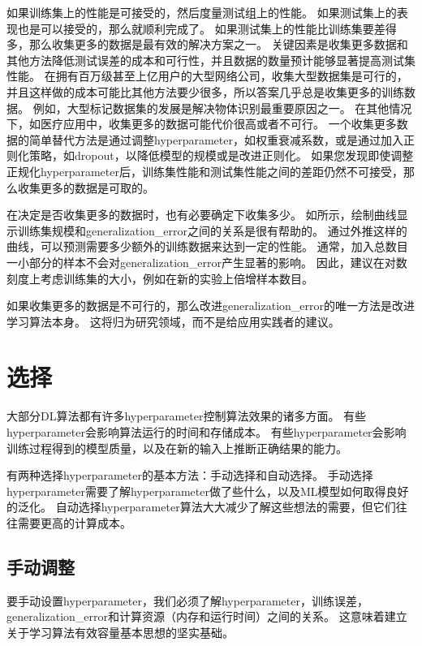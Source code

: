
如果训练集上的性能是可接受的，然后度量测试组上的性能。
如果测试集上的表现也是可以接受的，那么就顺利完成了。
如果测试集上的性能比训练集要差得多，那么收集更多的数据是最有效的解决方案之一。
关键因素是收集更多数据和其他方法降低测试误差的成本和可行性，并且数据的数量预计能够显著提高测试集性能。
在拥有百万级甚至上亿用户的大型网络公司，收集大型数据集是可行的，并且这样做的成本可能比其他方法要少很多，所以答案几乎总是收集更多的训练数据。
例如，大型标记数据集的发展是解决物体识别最重要原因之一。
在其他情况下，如医疗应用中，收集更多的数据可能代价很高或者不可行。
一个收集更多数据的简单替代方法是通过调整\gls{hyperparameter}，如权重衰减系数，或是通过加入正则化策略，如\gls{dropout}，以降低模型的规模或是改进正则化。
如果您发现即使调整正规化\gls{hyperparameter}后，训练集性能和测试集性能之间的差距仍然不可接受，那么收集更多的数据是可取的。

在决定是否收集更多的数据时，也有必要确定下收集多少。
如所示，绘制曲线显示训练集规模和\gls{generalization_error}之间的关系是很有帮助的。
通过外推这样的曲线，可以预测需要多少额外的训练数据来达到一定的性能。
通常，加入总数目一小部分的样本不会对\gls{generalization_error}产生显著的影响。
因此，建议在对数刻度上考虑训练集的大小，例如在新的实验上倍增样本数目。

如果收集更多的数据是不可行的，那么改进\gls{generalization_error}的唯一方法是改进学习算法本身。
这将归为研究领域，而不是给应用实践者的建议。

\section{选择}
\label{sec:selecting_hyperparameters}
大部分\gls{DL}算法都有许多\gls{hyperparameter}控制算法效果的诸多方面。
有些\gls{hyperparameter}会影响算法运行的时间和存储成本。
有些\gls{hyperparameter}会影响训练过程得到的模型质量，以及在新的输入上推断正确结果的能力。


有两种选择\gls{hyperparameter}的基本方法：手动选择和自动选择。
手动选择\gls{hyperparameter}需要了解\gls{hyperparameter}做了些什么，以及\gls{ML}模型如何取得良好的泛化。
自动选择\gls{hyperparameter}算法大大减少了解这些想法的需要，但它们往往需要更高的计算成本。

\subsection{手动调整}
\label{sec:manual_hyperparameter_tuning}
要手动设置\gls{hyperparameter}，我们必须了解\gls{hyperparameter}，训练误差，\gls{generalization_error}和计算资源（内存和运行时间）之间的关系。
这意味着建立关于学习算法有效容量基本思想的坚实基础。

